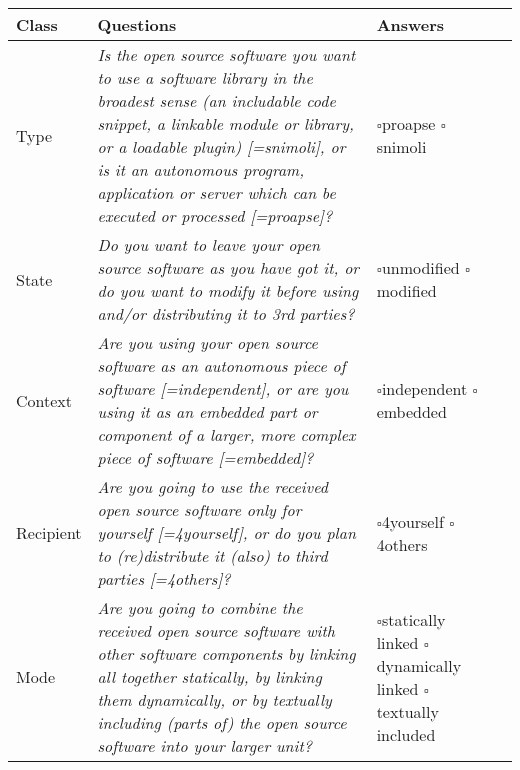 \begin{small}
\begin{tabular}[h]{|l|l|l|l|}
\hline 
Class & Questions & Answers\\
\hline 
  Type
  & \parbox[c][2.6cm][c]{9.4cm}{
    \textit{Is the open source software you want to use a software library
    in the broadest sense (an includable code snippet, a linkable module or
    library, or a loadable plugin) [=snimoli], or is it an autonomous
    program, application or server which can be executed or processed
    [=proapse]?}} & \parbox{10em}{ 
      $\square$\hspace{1em}proapse\\ 
      $\square$\hspace{1em}snimoli}
    \\
\hline 
  State & 
  \parbox[c][1.6cm][c]{9.4cm}{
  \textit{Do you want to leave your open source software as you have
  got it, or do you want to modify it before using and/or distributing it to 3rd
  parties?}} &
  \parbox{10em}{
    $\square$\hspace{1em}unmodified\\
    $\square$\hspace{1em}modified} \\
\hline 
  Context & 
  \parbox[c][2cm][c]{9.4cm}{
  \textit{Are you using your open source software as an au\-to\-no\-mous piece
  of software [=independent], or are you using it as an embedded part or component
  of a larger, more complex piece of software [=embedded]?}} &
  \parbox{10em}{ $\square$\hspace{1em}independent\\
    $\square$\hspace{1em}embedded}\\
\hline 
  Recipient & 
  \parbox[c][1.6cm][c]{9.4cm}{
  \textit{Are you going to use the received open source software only for
  yourself [=4yourself], or do you plan to (re)distribute it (also) to third
  parties [=4others]?}}
  & \parbox{10em}{
    $\square$\hspace{1em}4yourself\\
    $\square$\hspace{1em}4others}\\
\hline 
  Mode & 
  \parbox[c][2.6cm][c]{9.4cm}{
  \textit{Are you going to combine the received open source software with other
  software components by linking all together statically, by linking them
  dynamically, or by textually including (parts of) the open source software
  into your larger unit?}} &
  \parbox{10em}{
    $\square$\hspace{1em}statically linked\\   
    $\square$\hspace{1em}dynamically linked\\
    $\square$\hspace{1em}textually included}\\
\hline 
\hline
\end{tabular}
\end{small}

